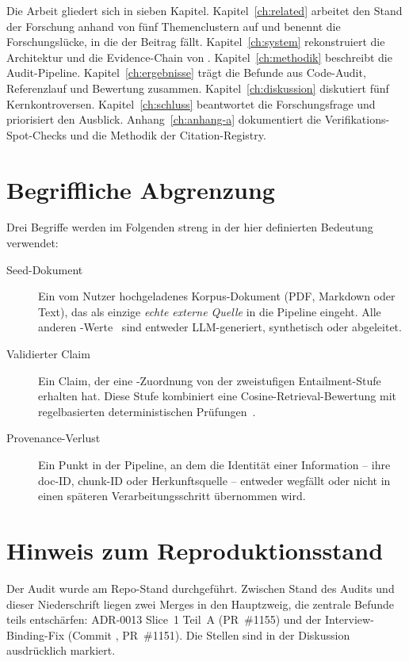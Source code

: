 Die Arbeit gliedert sich in sieben Kapitel. Kapitel~\ref{ch:related} arbeitet den Stand der Forschung anhand von fünf Themenclustern auf und benennt die Forschungslücke, in die der Beitrag fällt. Kapitel~\ref{ch:system} rekonstruiert die Architektur und die Evidence-Chain von \agora{}. Kapitel~\ref{ch:methodik} beschreibt die Audit-Pipeline. Kapitel~\ref{ch:ergebnisse} trägt die Befunde aus Code-Audit, Referenzlauf und Bewertung zusammen. Kapitel~\ref{ch:diskussion} diskutiert fünf Kernkontroversen. Kapitel~\ref{ch:schluss} beantwortet die Forschungsfrage und priorisiert den Ausblick. Anhang~\ref{ch:anhang-a} dokumentiert die Verifikations-Spot-Checks und die Methodik der Citation-Registry.

\section{Begriffliche Abgrenzung}\label{sec:begriffe}

Drei Begriffe werden im Folgenden streng in der hier definierten Bedeutung verwendet:

\begin{description}
  \item[Seed-Dokument] Ein vom Nutzer hochgeladenes Korpus-Dokument (PDF, Markdown oder Text), das als einzige \emph{echte externe Quelle} in die Pipeline eingeht. Alle anderen -Werte~\cite{adr-0013} sind entweder LLM-generiert, synthetisch oder abgeleitet.
  \item[Validierter Claim] Ein Claim, der eine -Zuordnung von der zweistufigen Entailment-Stufe erhalten hat. Diese Stufe kombiniert eine Cosine-Retrieval-Bewertung mit regelbasierten deterministischen Prüfungen~\cite{adr-0011}.
  \item[Provenance-Verlust] Ein Punkt in der Pipeline, an dem die Identität einer Information -- ihre doc-ID, chunk-ID oder Herkunftsquelle -- entweder wegfällt oder nicht in einen späteren Verarbeitungsschritt übernommen wird.
\end{description}

\section{Hinweis zum Reproduktionsstand}\label{sec:reproduktion}

Der Audit wurde am Repo-Stand  durchgeführt. Zwischen Stand des Audits und dieser Niederschrift liegen zwei Merges in den Hauptzweig, die zentrale Befunde teils entschärfen: ADR-0013 Slice~1 Teil~A (PR~\#1155) und der Interview-Binding-Fix (Commit , PR~\#1151). Die Stellen sind in der Diskussion ausdrücklich markiert.